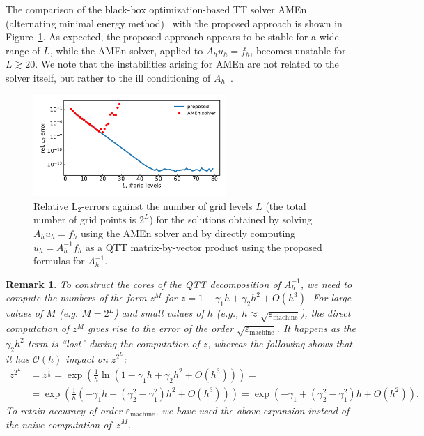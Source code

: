 \documentclass[a4paper]{article}
\newtheorem{remark}{Remark}[section]
\newcommand{\LL}{L}
\begin{document}
The comparison of the black-box optimization-based TT solver AMEn (alternating minimal energy method)~\cite{ds-amen-2014} with the proposed approach is shown in Figure~\ref{fig:numerical}.
As expected, the proposed approach appears to be stable for a wide range of $\LL$, while the AMEn solver, applied to $A_h u_h = f_h$, becomes unstable for $\LL\gtrsim 20$.
We note that the instabilities arising for AMEn are not related to the solver itself, but rather to the ill conditioning of $A_h$~.

\begin{figure}
    \centering
    \includegraphics[width=0.65\textwidth]{robust.pdf}
    \caption{Relative $\mathrm{L}_2$-errors against the number of grid levels $\LL$ (the total number of grid points is $2^\LL$) for the solutions obtained by solving $A_h u_h = f_h$ using the AMEn solver and by directly computing $u_h = A_h^{-1}f_h$ as a QTT matrix-by-vector product using the proposed formulas for $A_h^{-1}$.}
    \label{fig:numerical}
\end{figure}

\begin{remark}
To construct the cores of the QTT decomposition of $A_h^{-1}$, we need to compute the numbers of the form $z^M$ for $z = 1 - \gamma_1 h + \gamma_2 h^2 + O(h^3)$.
For large values of $M$ (e.g. $M = 2^\LL$) and small values of $h$ (e.g., $h \approx \sqrt{\varepsilon_{\mathrm{machine}}}$), the direct computation of $z^M$ gives rise to the error of the order $\sqrt{\varepsilon_{\mathrm{machine}}}$.
It happens as the $\gamma_2h^2$ term is ``lost'' during the computation of $z$, whereas the following shows that it has $\mathcal{O}(h)$ impact on $z^{2^L}$:
\begin{align*}
z^{2^L} &= z^{\frac{1}{h}} = \exp\left(\frac{1}{h}\ln(1 - \gamma_1 h + \gamma_2 h^2 + O(h^3))\right) = \\ &= \exp\left(\frac{1}{h}(-\gamma_1 h + (\gamma_2^2-\gamma_1^2)h^2 + O(h^3))\right)
= \exp(-\gamma_1 + (\gamma_2^2 - \gamma_1^2)h + O(h^2)).
\end{align*}
To retain accuracy of order $\varepsilon_{\mathrm{machine}}$, we have used the above expansion instead of the naive computation of~$z^M$.
\end{remark}
\end{document}
